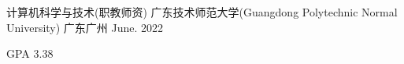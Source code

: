

\begin{cventries}

  \cventry
    {计算机科学与技术(职教师资)} %
    {广东技术师范大学(Guangdong Polytechnic Normal University)} %
    {广东广州} %
    {June. 2022} %
    {
      \begin{cvitems} %
        \item {GPA 3.38}
      \end{cvitems}
    }

\end{cventries}
